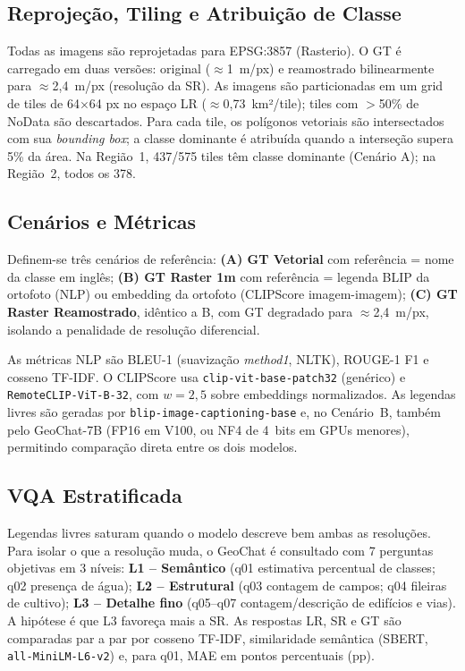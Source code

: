 \documentclass[12pt]{article}
\begin{document}
\subsection{Reprojeção, Tiling e Atribuição de Classe}

Todas as imagens são reprojetadas para EPSG:3857 (Rasterio). O GT é
carregado em duas versões: original ($\approx$1~m/px) e reamostrado
bilinearmente para $\approx$2,4~m/px (resolução da SR). As imagens são
particionadas em um grid de tiles de 64$\times$64 px no espaço LR
($\approx$0,73~km²/tile); tiles com $>$50\% de NoData são descartados.
Para cada tile, os polígonos vetoriais são intersectados com sua
\textit{bounding box}; a classe dominante é atribuída quando a interseção
supera 5\% da área. Na Região~1, 437/575 tiles têm classe dominante
(Cenário A); na Região~2, todos os 378.

\subsection{Cenários e Métricas}

Definem-se três cenários de referência:
\textbf{(A) GT Vetorial} com referência = nome da classe em inglês;
\textbf{(B) GT Raster 1m} com referência = legenda BLIP da ortofoto (NLP)
ou embedding da ortofoto (CLIPScore imagem-imagem);
\textbf{(C) GT Raster Reamostrado}, idêntico a B, com GT degradado para
$\approx$2,4~m/px, isolando a penalidade de resolução diferencial.

As métricas NLP são BLEU-1 (suavização \textit{method1}, NLTK), ROUGE-1
F1 e cosseno TF-IDF. O CLIPScore usa \texttt{clip-vit-base-patch32}
(genérico) e \texttt{RemoteCLIP-ViT-B-32}, com $w=2{,}5$ sobre embeddings
normalizados. As legendas livres são geradas por
\texttt{blip-image-captioning-base} e, no Cenário~B, também pelo GeoChat-7B
(FP16 em V100, ou NF4 de 4~bits em GPUs menores), permitindo comparação
direta entre os dois modelos.

\subsection{VQA Estratificada}

Legendas livres saturam quando o modelo descreve bem ambas as resoluções.
Para isolar o que a resolução muda, o GeoChat é consultado com 7 perguntas
objetivas em 3 níveis: \textbf{L1 -- Semântico} (q01 estimativa percentual
de classes; q02 presença de água); \textbf{L2 -- Estrutural} (q03 contagem
de campos; q04 fileiras de cultivo); \textbf{L3 -- Detalhe fino} (q05--q07
contagem/descrição de edifícios e vias). A hipótese é que L3 favoreça mais
a SR. As respostas LR, SR e GT são comparadas par a par por cosseno TF-IDF,
similaridade semântica (SBERT, \texttt{all-MiniLM-L6-v2}) e, para q01, MAE em
pontos percentuais (pp).
\end{document}
